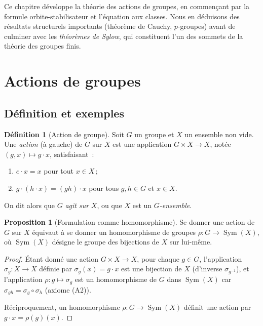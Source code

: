 \documentclass[12pt,a4paper,openany]{book}
\theoremstyle{definition}
\newtheorem{definition}{Définition}[chapter]
\newtheorem{proposition}{Proposition}[chapter]
\DeclareMathOperator{\Sym}{Sym}
\begin{document}
\medskip

Ce chapitre développe la théorie des actions de groupes, en
commençant par la formule orbite-stabilisateur et l'équation aux
classes. Nous en déduisons des résultats structurels importants
(théorème de Cauchy, $p$-groupes) avant de culminer avec les
\emph{théorèmes de Sylow}, qui constituent l'un des
sommets de la théorie des groupes finis.

\section{Actions de groupes}\label{sec:actions}

\subsection{Définition et exemples}\label{subsec:action-def}

\begin{definition}[Action de groupe]\label{def:action}
  Soit $G$ un groupe et $X$ un ensemble non vide. Une
  \emph{action} (à gauche) de $G$ sur $X$
  est une application $G\times X\to X$, notée $(g,x)\mapsto g\cdot x$,
  satisfaisant~:
  \begin{enumerate}[label=(A\arabic*)]
    \item $e\cdot x = x$ pour tout $x\in X$\,;
    \item $g\cdot(h\cdot x) = (gh)\cdot x$ pour tous $g,h\in G$ et $x\in X$.
  \end{enumerate}
  On dit alors que $G$ \emph{agit sur} $X$, ou que $X$ est un
  \emph{$G$-ensemble}.
\end{definition}

\begin{proposition}[Formulation comme homomorphisme]\label{prop:action-hom}
  Se donner une action de $G$ sur $X$ équivaut à se donner un
  homomorphisme de groupes $\rho\colon G\to\Sym(X)$, où $\Sym(X)$
  désigne le groupe des bijections de $X$ sur lui-même.
\end{proposition}

\begin{proof}
  Étant donné une action $G\times X\to X$, pour chaque $g\in G$,
  l'application $\sigma_g\colon X\to X$ définie par $\sigma_g(x)=g\cdot x$
  est une bijection de $X$ (d'inverse $\sigma_{g^{-1}}$), et
  l'application $\rho\colon g\mapsto\sigma_g$ est un homomorphisme de
  $G$ dans $\Sym(X)$ car $\sigma_{gh}=\sigma_g\circ\sigma_h$
  (axiome (A2)).

  Réciproquement, un homomorphisme $\rho\colon G\to\Sym(X)$ définit une
  action par $g\cdot x = \rho(g)(x)$.
\end{proof}
\end{document}
